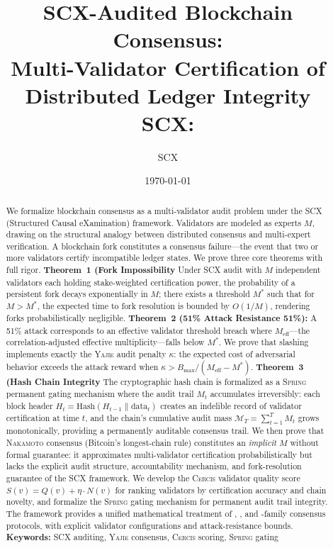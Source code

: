 \documentclass[11pt,a4paper]{article}
\title{\textbf{SCX-Audited Blockchain Consensus:}\\
\large Multi-Validator Certification of Distributed Ledger Integrity\\
\small SCX: }
\author{SCX}
\date{\today}
\theoremstyle{definition}
\newcommand{\Yajie}{\textsc{Yajie}}
\newcommand{\Spring}{\textsc{Spring}}
\newcommand{\Cercis}{\textsc{Cercis}}
\newcommand{\SCX}{\textsc{SCX}}
\newcommand{\mthreshold}{M^{*}}
\newcommand{\Nakamoto}{\textsc{Nakamoto}}
\newcommand{\PoW}{\mathrm{PoW}}
\newcommand{\PoS}{\mathrm{PoS}}
\newcommand{\PBFT}{\mathrm{PBFT}}
\begin{document}
\maketitle
\begin{abstract}
We formalize blockchain consensus as a multi-validator audit problem under the \SCX{} (Structured Causal eXamination) framework. Validators are modeled as experts $M$, drawing on the structural analogy between distributed consensus and multi-expert verification. A blockchain fork constitutes a consensus failure—the event that two or more validators certify incompatible ledger states. We prove three core theorems with full rigor. \textbf{Theorem~1 (Fork Impossibility} Under \SCX{} audit with $M$ independent validators each holding stake-weighted certification power, the probability of a persistent fork decays exponentially in $M$; there exists a threshold $\mthreshold$ such that for $M > \mthreshold$, the expected time to fork resolution is bounded by $O(1/M)$, rendering forks probabilistically negligible. \textbf{Theorem~2 (51\% Attack Resistance 51\%):} A 51\% attack corresponds to an effective validator threshold breach where $M_{\mathrm{eff}}$—the correlation-adjusted effective multiplicity—falls below $\mthreshold$. We prove that \PoS{} slashing implements exactly the \Yajie{} audit penalty $\kappa$: the expected cost of adversarial behavior exceeds the attack reward when $\kappa > B_{\max} / (M_{\mathrm{eff}} - \mthreshold)$. \textbf{Theorem~3 (Hash Chain Integrity} The cryptographic hash chain is formalized as a \Spring{} permanent gating mechanism where the audit trail $M_t$ accumulates irreversibly: each block header $H_t = \mathrm{Hash}(H_{t-1} \parallel \mathrm{data}_t)$ creates an indelible record of validator certification at time $t$, and the chain's cumulative audit mass $\mathcal{M}_T = \sum_{t=1}^{T} M_t$ grows monotonically, providing a permanently auditable consensus trail. We then prove that \Nakamoto{} consensus (Bitcoin's longest-chain rule) constitutes an \textit{implicit} $M$ without formal guarantee: it approximates multi-validator certification probabilistically but lacks the explicit audit structure, accountability mechanism, and fork-resolution guarantee of the \SCX{} framework. We develop the \Cercis{} validator quality score $S(v) = Q(v) + \eta \cdot N(v)$ for ranking validators by certification accuracy and chain novelty, and formalize the \Spring{} gating mechanism for permanent audit trail integrity. The framework provides a unified mathematical treatment of \PoW{}, \PoS{}, and \PBFT{}-family consensus protocols, with explicit validator configurations and attack-resistance bounds.
\medskip
\noindent\textbf{Keywords:} SCX auditing,  \Yajie{} consensus,  \Cercis{} scoring,  \Spring{} gating
\end{abstract}
\end{document}

